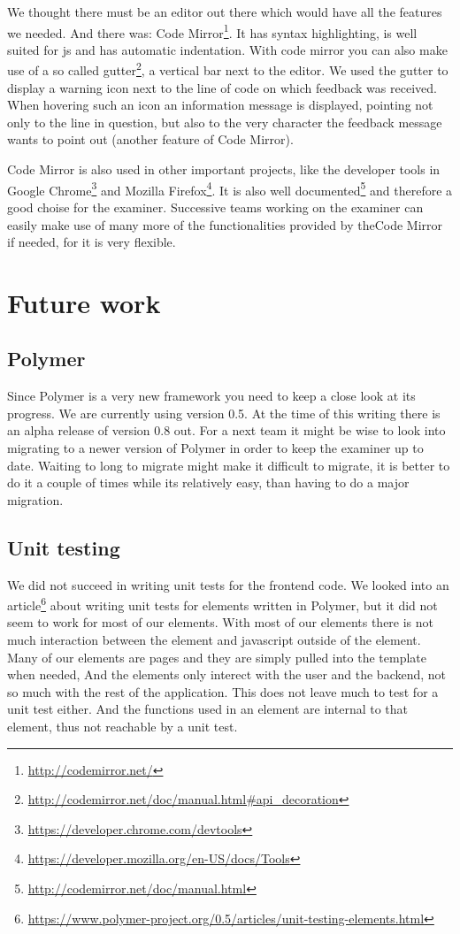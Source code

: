 We thought there must be an editor out there
which would have all the features we needed.
And there was: Code Mirror\footnote{\url{http://codemirror.net/}}.
It has syntax highlighting,
is well suited for \gls{js}
and has automatic indentation.
With code mirror you can also make use of a so called
gutter\footnote{\url{http://codemirror.net/doc/manual.html\#api_decoration}},
a vertical bar next to the editor.
We used the gutter to display a warning icon next to the line of code
on which feedback was received.
When hovering such an icon an information message is displayed,
pointing not only to the line in question,
but also to the very character the feedback message wants to point out
(another feature of Code Mirror).

Code Mirror is also used in other important projects,
like the developer tools in
Google Chrome\footnote{\url{https://developer.chrome.com/devtools}} and
Mozilla Firefox\footnote{\url{https://developer.mozilla.org/en-US/docs/Tools}}.
It is also
well documented\footnote{\url{http://codemirror.net/doc/manual.html}}
and therefore a good choise for the \gls{examiner}.
Successive teams working on the \gls{examiner}
can easily make use of many more of
the functionalities provided by theCode Mirror if needed,
for it is very flexible.

\section{Future work}

\subsection{Polymer}
Since Polymer is a very new framework
you need to keep a close look at its progress.
We are currently using version 0.5.
At the time of this writing there is an alpha release of version 0.8 out.
For a next team it might be wise to look into
migrating to a newer version of Polymer
in order to keep the \gls{examiner} up to date.
Waiting to long to migrate might make it difficult to migrate,
it is better to do it a couple of times while its relatively easy,
than having to do a major migration.

\subsection{Unit testing}
We did not succeed in writing unit tests for the frontend code.
We looked into
an article\footnote{\url{https://www.polymer-project.org/0.5/articles/unit-testing-elements.html}}
about writing unit tests
for elements written in Polymer,
but it did not seem to work for most of our elements.
With most of our elements there is not much interaction
between the element and javascript outside of the element.
Many of our elements are pages
and they are simply pulled into the template when needed,
And the elements only interect with the user and the backend,
not so much with the rest of the application.
This does not leave much to test for a unit test either.
And the functions used in an element are internal to that element,
thus not reachable by a unit test.

